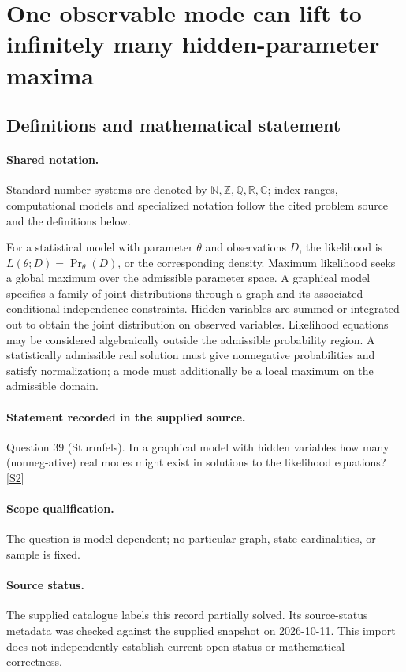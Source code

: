 \documentclass[11pt]{article}
\newcommand{\sref}[2]{\hyperlink{source:#1:#2}{[S#2]}}
\begin{document}
\section{One observable mode can lift to infinitely many hidden-parameter maxima}\label{statement}

\subsection{Definitions and mathematical statement}

\paragraph{Shared notation.}Standard number systems are denoted by $\mathbb N,\mathbb Z,\mathbb Q,\mathbb R,\mathbb C$; index ranges, computational models and specialized notation follow the cited problem source and the definitions below.


For a statistical model with parameter $\theta$ and observations $D$, the likelihood is $L(\theta;D)=\Pr_\theta(D)$, or the corresponding density. Maximum likelihood seeks a global maximum over the admissible parameter space. A graphical model specifies a family of joint distributions through a graph and its associated conditional-independence constraints. Hidden variables are summed or integrated out to obtain the joint distribution on observed variables. Likelihood equations may be considered algebraically outside the admissible probability region. A statistically admissible real solution must give nonnegative probabilities and satisfy normalization; a mode must additionally be a local maximum on the admissible domain.
\paragraph{Statement recorded in the supplied source.}
Question 39 (Sturmfels). In a graphical model with hidden variables how many (nonneg-ative) real modes might exist in solutions to the likelihood equations? \sref{statement}{2}
\paragraph{Scope qualification.}
The question is model dependent; no particular graph, state cardinalities, or sample is fixed.
\paragraph{Source status.}
The supplied catalogue labels this record partially solved. Its source-status metadata was checked against the supplied snapshot on 2026-10-11. This import does not independently establish current open status or mathematical correctness.
\end{document}
